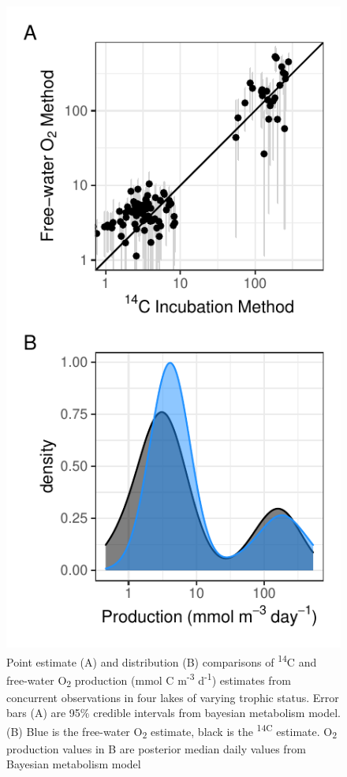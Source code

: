 \documentclass[12pt, oneside]{article}
\begin{document}
\begin{figure}
\centering
\includegraphics{point_estimates.pdf}
\caption{Point estimate (A) and distribution (B) comparisons of \textsuperscript{14}C and free-water O\textsubscript{2} production (mmol C m\textsuperscript{-3} d\textsuperscript{-1}) estimates from concurrent observations in four lakes of varying trophic status. Error bars (A) are 95\% credible intervals from bayesian metabolism model. (B) Blue is the free-water O\textsubscript{2} estimate, black is the \textsuperscript{14C} estimate. O\textsubscript{2} production values in B are posterior median daily values from Bayesian metabolism model}
\label{fig:pointestimates}
\end{figure}
\end{document}
